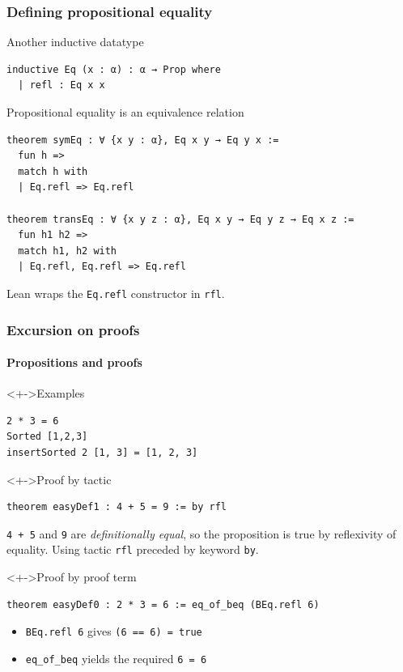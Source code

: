 \documentclass{beamer}
\begin{document}
\begin{frame}
  \frametitle{Defining propositional equality}
  Another inductive datatype
\begin{lstlisting}
inductive Eq (x : α) : α → Prop where
  | refl : Eq x x
\end{lstlisting}
  Propositional equality is an equivalence relation
\begin{lstlisting}
theorem symEq : ∀ {x y : α}, Eq x y → Eq y x :=
  fun h =>
  match h with
  | Eq.refl => Eq.refl

theorem transEq : ∀ {x y z : α}, Eq x y → Eq y z → Eq x z :=
  fun h1 h2 =>
  match h1, h2 with
  | Eq.refl, Eq.refl => Eq.refl
\end{lstlisting}
  \begin{alertblock}{}
    Lean wraps the \lstinline{Eq.refl} constructor in \lstinline{rfl}.
  \end{alertblock}
\end{frame}
\begin{frame}[fragile]
  \frametitle{Excursion on proofs}
  \framesubtitle{Propositions and proofs}
  \begin{exampleblock}<+->{Examples}
\begin{lstlisting}
2 * 3 = 6
Sorted [1,2,3]
insertSorted 2 [1, 3] = [1, 2, 3]
\end{lstlisting}
  \end{exampleblock}
  \vspace{-0.5\baselineskip}
  \begin{block}<+->{Proof by tactic}
\begin{lstlisting}
theorem easyDef1 : 4 + 5 = 9 := by rfl
\end{lstlisting}
    \lstinline{4 + 5} and \lstinline{9} are \emph{definitionally equal}, so the
    proposition is true by reflexivity of equality. Using tactic \lstinline{rfl}
    preceded by keyword \lstinline{by}.
  \end{block}
  \vspace{-0.5\baselineskip}
  \begin{block}<+->{Proof by proof term}
\begin{lstlisting}
theorem easyDef0 : 2 * 3 = 6 := eq_of_beq (BEq.refl 6)
\end{lstlisting}
    \begin{itemize}
    \item \lstinline{BEq.refl 6} gives \lstinline{(6 == 6) = true}
    \item \lstinline{eq_of_beq} yields the required \lstinline{6 = 6}
    \end{itemize}
  \end{block}
\end{frame}
\end{document}
